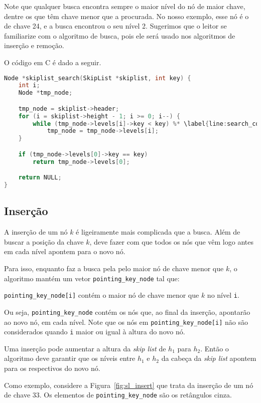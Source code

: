 \documentclass[paper=a4, fontsize=11pt]{scrartcl} %
\numberwithin{equation}{section}
\numberwithin{figure}{section}
\numberwithin{table}{section}
\numberwithin{definition}{section}
\numberwithin{theorem}{section}
\numberwithin{property}{section}
\numberwithin{proposition}{section}
\renewcommand{\sl}{\textit{skip list}\xspace}
\begin{document}
Note que qualquer busca encontra sempre o maior nível do nó de maior chave, dentre os que têm chave menor que a
procurada. No nosso exemplo, esse nó é o de chave 24, e a busca encontrou o seu nível 2. Sugerimos que o leitor
se familiarize com o algoritmo de busca, pois ele será usado nos algoritmos de inserção e remoção.

O código em C é dado a seguir.
\begin{lstlisting}[caption=Busca., language=C]
Node *skiplist_search(SkipList *skiplist, int key) {
    int i;
    Node *tmp_node;

    tmp_node = skiplist->header;
    for (i = skiplist->height - 1; i >= 0; i--) {
        while (tmp_node->levels[i]->key < key) %* \label{line:search_cost} *)
            tmp_node = tmp_node->levels[i];
    }

    if (tmp_node->levels[0]->key == key)
        return tmp_node->levels[0];

    return NULL;
}
\end{lstlisting} \FloatBarrier

\subsection{Inserção}

A inserção de um nó $k$ é ligeiramente mais complicada que a busca. Além de buscar a posição da chave $k$, deve
fazer com que todos os nós que vêm logo antes em cada nível apontem para o novo nó.

Para isso, enquanto faz a busca pela pelo maior nó de chave menor que $k$, o algoritmo mantém um vetor 
\verb|pointing_key_node| tal que:

\begin{center}
\verb|pointing_key_node[i]| contém o maior nó de chave menor que $k$ no nível \verb|i|.
\end{center}

Ou seja, \verb|pointing_key_node| contém os nós que, ao final da inserção, apontarão ao novo nó, em cada nível.
Note que os nós em \verb|pointing_key_node[i]| não são considerados quando 
\verb|i| maior ou igual à altura do novo nó.

Uma inserção pode aumentar a altura da \sl de $h_1$ para $h_2$. Então o algoritmo deve garantir que os níveis
entre $h_1$ e $h_2$ da cabeça da \sl apontem para os respectivos do novo nó.

Como exemplo, considere a Figura~\ref{fig:sl_insert} que trata da inserção de um nó de chave $33$. Os elementos
de \verb|pointing_key_node| são os retângulos cinza.
\end{document}
